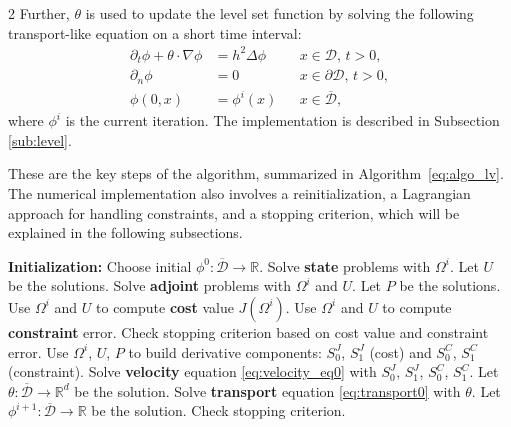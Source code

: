 \documentclass[a4paper, oneside]{article}
\newcommand{\Om}{\Omega}
\newcommand{\VV}{\theta}
\begin{document}
\begin{multicols}{2}
Further, $\VV$ is used to update
the level set function by solving the following transport-like equation on a short time interval:
\begin{equation} \label{eq:transport0}
	\begin{aligned}
	\partial_t \phi+\theta\cdot\nabla\phi &= h^2\Delta\phi && x\in \mathcal{D},\, t>0, \\
						\partial_{n} \phi &= 0 && x\in \partial\mathcal{D},\, t>0, \\
							   \phi(0, x) &= \phi^{i}(x) && x\in \overline{\mathcal{D}},
	\end{aligned}
	\end{equation}
	where $\phi^{i}$ is the current iteration.
	The implementation is described in Subsection \ref{sub:level}.

	These are the key steps of the algorithm, summarized in Algorithm~\ref{eq:algo_lv}.
The numerical implementation also involves a reinitialization, a Lagrangian approach for handling constraints, and a stopping criterion, which
will be explained in the following subsections.


\begin{algorithm}[H] 
\caption{Level set algorithm} \label{eq:algo_lv}
\small
\begin{algorithmic}[1]
\State \textbf{Initialization:} Choose initial $\phi^0:\overline{\mathcal{D}} \rightarrow \mathds{R}$.
	\State Solve \textbf{state} problems with $\Omega^i$.
	\Statex \hspace{3em} Let $U$ be the solutions.
    \State Solve  \textbf{adjoint} problems with $\Omega^i$ and $U$.
	\Statex \hspace{3em} Let $P$ be the solutions.
	\State Use $\Omega^i$ and $U$ to compute \textbf{cost} value $J(\Om^i)$.
	\State Use $\Omega^i$ and $U$ to compute \textbf{constraint} error.
	\State Check stopping criterion based on cost value and constraint error.
	\State Use $\Omega^i$, $U$, $P$ to build derivative components:
	\Statex \hspace{1.2em} $S_0^{J}$, $S_1^{J}$ (cost) and $S_0^{C}$, $S_1^{C}$ (constraint).
	\State Solve \textbf{velocity} equation \eqref{eq:velocity_eq0} with $S_0^{J}$, $S_1^{J}$, $S_0^{C}$, $S_1^{C}$.
	\Statex \hspace{3em} Let $\theta:\overline{\mathcal{D}} \rightarrow \mathds{R}^d$ be the solution.
	\State Solve \textbf{transport} equation \eqref{eq:transport0} with $\theta$.
	\Statex \hspace{3em} Let $\phi^{i+1}:\overline{\mathcal{D}} \rightarrow \mathds{R}$ be the solution.
	\State Check stopping criterion.
\EndFor
\end{algorithmic}
\end{algorithm}


\end{multicols}
\end{document}
